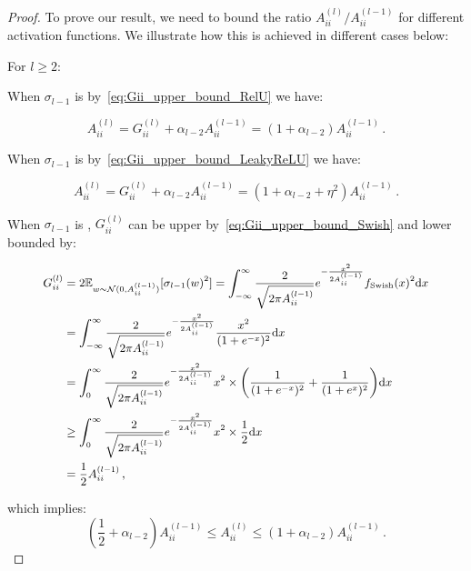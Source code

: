 \documentclass[nohyperref]{article}
\theoremstyle{plain}
\theoremstyle{definition}
\theoremstyle{remark}
\begin{document}
\begin{proof}
To prove our result, we need to bound the ratio $A_{ii}^{(l)}/A_{ii}^{(l-1)}$ for different activation functions. We illustrate how this is achieved in different cases below:


For $l \geq 2$:

When $\sigma_{l-1}$ is  by~\cref{eq:Gii_upper_bound_RelU} we have:

\begin{equation}
A_{ii}^{(l)}=G_{ii}^{(l)}+ \alpha_{l-2}A_{ii}^{(l-1)} = (1+\alpha_{l-2})A_{ii}^{(l-1)}\,.
\label{eq:Aii_bound_ReLU}
\end{equation}

When $\sigma_{l-1}$ is  by~\cref{eq:Gii_upper_bound_LeakyReLU} we have:

\begin{equation}
A_{ii}^{(l)}=G_{ii}^{(l)}+\alpha_{l-2}A_{ii}^{(l-1)} = (1+\alpha_{l-2}+\eta^2)A_{ii}^{(l-1)}\,.
\label{eq:Aii_bound_LeakyReLU}
\end{equation}


When $\sigma_{l-1}$ is , $G_{ii}^{(l)}$ can be upper by~\cref{eq:Gii_upper_bound_Swish} and lower bounded by:

\begin{equation}
\small
\begin{split}
G_{ii}^{(l)}&=2\mathbb{E}_{w \sim \mathcal N(0,A_{ii}^{(l-1)})}[\sigma_{l-1}(w)^2] =\int_{-\infty}^{\infty}\frac{2}{\sqrt{2\pi A_{ii}^{(l-1)}}}e^{-\frac{x^2}{2A_{ii}^{(l-1)}}}f_{\mathrm{Swish}}(x)^2 \mathrm{d}x\\
& = \int_{-\infty}^{\infty}\frac{2}{\sqrt{2\pi A_{ii}^{(l-1)}}}e^{-\frac{x^2}{2A_{ii}^{(l-1)}}}\frac{x^2}{(1+e^{-x})^2} \mathrm{d}x\\
& = \int_{0}^{\infty}\frac{2}{\sqrt{2\pi A_{ii}^{(l-1)}}}e^{-\frac{x^2}{2A_{ii}^{(l-1)}}}x^2\times \bigg(\frac{1}{(1+e^{-x})^2}+\frac{1}{(1+e^{x})^2}\bigg) \mathrm{d}x\\
& \geq \int_{0}^{\infty}\frac{2}{\sqrt{2\pi A_{ii}^{(l-1)}}}e^{-\frac{x^2}{2A_{ii}^{(l-1)}}}x^2\times \frac{1}{2}\mathrm{d}x\\
& = \frac{1}{2}A_{ii}^{(l-1)}\,,
\end{split}
\label{eq:Gii_lower_bound_Swish}
\end{equation}

which implies:
\begin{equation}
\left(\frac{1}{2}+\alpha_{l-2}\right) A_{ii}^{(l-1)} \leq A_{ii}^{(l)}\leq (1+\alpha_{l-2})A_{ii}^{(l-1)}\,.
\label{eq:Aii_bound_Swish}
\end{equation}



\end{proof}
\end{document}

